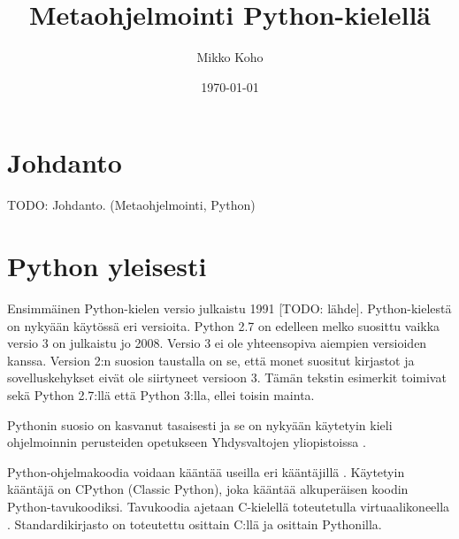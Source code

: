 \documentclass[finnish]{tktltiki2}
\title{Metaohjelmointi Python-kielellä}
\author{Mikko Koho}
\date{\today}
\theoremstyle{definition}
\theoremstyle{remark}
\begin{document}
    

\frontmatter      %

\maketitle        %

\makeabstract     %

\tableofcontents  %


\mainmatter       %


\section{Johdanto}

TODO: Johdanto. (Metaohjelmointi, Python)

\section{Python yleisesti}


Ensimmäinen Python-kielen versio julkaistu 1991 [TODO: lähde]. Python-kielestä on nykyään käytössä eri versioita. Python 2.7 on edelleen melko suosittu vaikka versio 3 on julkaistu jo 2008. Versio 3 ei ole yhteensopiva aiempien versioiden kanssa. Version 2:n suosion taustalla on se, että monet suositut kirjastot ja sovelluskehykset eivät ole siirtyneet versioon 3. Tämän tekstin esimerkit toimivat sekä Python 2.7:llä että Python 3:lla, ellei toisin mainta.

Pythonin suosio on kasvanut tasaisesti ja se on nykyään käytetyin kieli ohjelmoinnin perusteiden opetukseen Yhdysvaltojen yliopistoissa \cite{python-teaching}.

Python-ohjelmakoodia voidaan kääntää useilla eri kääntäjillä \cite{martelli2006python}. Käytetyin kääntäjä on CPython (Classic Python), joka kääntää alkuperäisen koodin Python-tavukoodiksi. Tavukoodia ajetaan C-kielellä toteutetulla virtuaalikoneella \cite{martelli2006python}. Standardikirjasto on toteutettu osittain C:llä ja osittain Pythonilla.
\end{document}
